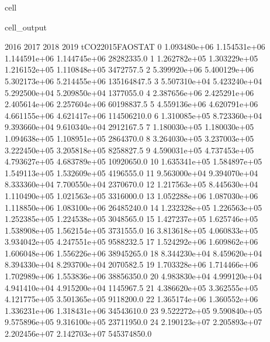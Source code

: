 \documentclass[letterpaper,10pt,english]{jupyterBook}
\begin{document}
\begin{sphinxuseclass}{cell}
\begin{sphinxVerbatimOutput}
\begin{sphinxuseclass}{cell_output}
\begin{sphinxVerbatim}[commandchars=\\\{\}]
            2016          2017          2018          2019  tCO2\PYGZus{}2015\PYGZus{}FAOSTAT  \PYGZbs{}
0   1.093480e+06  1.154531e+06  1.144591e+06  1.144745e+06         28282335.0   
1   1.262782e+05  1.303229e+05  1.216152e+05  1.110848e+05          3472757.5   
2   5.399920e+06  5.400129e+06  5.302173e+06  5.214455e+06        135164847.5   
3   5.507310e+04  5.423240e+04  5.292500e+04  5.209850e+04          1377055.0   
4   2.387656e+06  2.425291e+06  2.405614e+06  2.257604e+06         60198837.5   
5   4.559136e+06  4.620791e+06  4.661155e+06  4.621417e+06        114506210.0   
6   1.310085e+05  8.723360e+04  9.393660e+04  9.610340e+04          2912167.5   
7   1.180030e+05  1.180030e+05  1.094638e+05  1.108951e+05          2864370.0   
8   3.264030e+05  3.237003e+05  3.222450e+05  3.205818e+05          8258827.5   
9   4.590031e+05  4.737453e+05  4.793627e+05  4.683789e+05         10920650.0   
10  1.635341e+05  1.584897e+05  1.549113e+05  1.532609e+05          4196555.0   
11  9.563000e+04  9.394070e+04  8.333360e+04  7.700550e+04          2370670.0   
12  1.217563e+05  8.445630e+04  1.110490e+05  1.021563e+05          3316000.0   
13  1.052288e+06  1.087030e+06  1.118850e+06  1.083100e+06         26485240.0   
14  1.232328e+05  1.226563e+05  1.252385e+05  1.224538e+05          3048565.0   
15  1.427237e+05  1.625746e+05  1.538908e+05  1.562154e+05          3731555.0   
16  3.813618e+05  4.060833e+05  3.934042e+05  4.247551e+05          9588232.5   
17  1.524292e+06  1.609862e+06  1.606048e+06  1.556226e+06         38945265.0   
18  8.344230e+04  8.459620e+04  8.394330e+04  8.293700e+04          2070582.5   
19  1.703328e+06  1.714466e+06  1.702989e+06  1.553836e+06         38856350.0   
20  4.983830e+04  4.999120e+04  4.941410e+04  4.915200e+04          1145967.5   
21  4.386620e+05  3.362555e+05  4.121775e+05  3.501365e+05          9118200.0   
22  1.365174e+06  1.360552e+06  1.336231e+06  1.318431e+06         34543610.0   
23  9.522272e+05  9.590840e+05  9.575896e+05  9.316100e+05         23711950.0   
24  2.190123e+07  2.205893e+07  2.202456e+07  2.142703e+07        545374850.0   


\end{sphinxVerbatim}
\end{sphinxuseclass}
\end{sphinxVerbatimOutput}
\end{sphinxuseclass}
\end{document}
